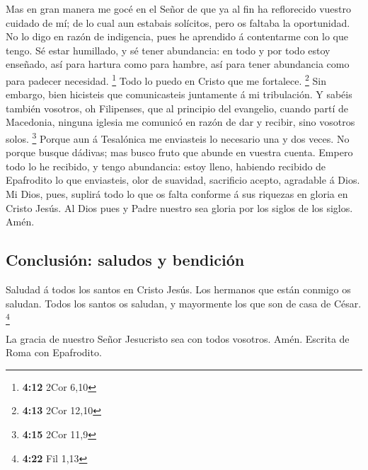  Mas en gran manera me gocé en el Señor de que ya al fin ha
reflorecido vuestro cuidado de mí; de lo cual aun estabais solícitos,
pero os faltaba la oportunidad.  No lo digo en razón de
indigencia, pues he aprendido á contentarme con lo que tengo.
 Sé estar humillado, y sé tener abundancia: en todo y por
todo estoy enseñado, así para hartura como para hambre, así para tener
abundancia como para padecer necesidad. \footnote{\textbf{4:12} 2Cor
  6,10}  Todo lo puedo en Cristo que me fortalece.
\footnote{\textbf{4:13} 2Cor 12,10}  Sin embargo, bien
hicisteis que comunicasteis juntamente á mi tribulación.  Y
sabéis también vosotros, oh Filipenses, que al principio del evangelio,
cuando partí de Macedonia, ninguna iglesia me comunicó en razón de dar y
recibir, sino vosotros solos. \footnote{\textbf{4:15} 2Cor 11,9}
 Porque aun á Tesalónica me enviasteis lo necesario una y
dos veces.  No porque busque dádivas; mas busco fruto que
abunde en vuestra cuenta.  Empero todo lo he recibido, y
tengo abundancia: estoy lleno, habiendo recibido de Epafrodito lo que
enviasteis, olor de suavidad, sacrificio acepto, agradable á Dios.
 Mi Dios, pues, suplirá todo lo que os falta conforme á sus
riquezas en gloria en Cristo Jesús.  Al Dios pues y Padre
nuestro sea gloria por los siglos de los siglos. Amén.

\hypertarget{conclusiuxf3n-saludos-y-bendiciuxf3n}{%
\subsection{Conclusión: saludos y
bendición}\label{conclusiuxf3n-saludos-y-bendiciuxf3n}}

 Saludad á todos los santos en Cristo Jesús. Los hermanos
que están conmigo os saludan.  Todos los santos os saludan,
y mayormente los que son de casa de César. \footnote{\textbf{4:22} Fil
  1,13}

 La gracia de nuestro Señor Jesucristo sea con todos
vosotros. Amén. Escrita de Roma con Epafrodito.
